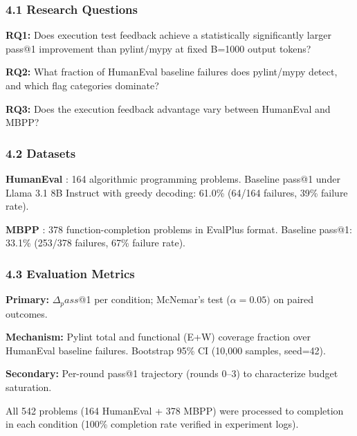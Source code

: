 
\subsubsection{4.1 Research Questions}

\textbf{RQ1:} Does execution test feedback achieve a statistically significantly larger pass@1 improvement than pylint/mypy at fixed B=1000 output tokens?

\textbf{RQ2:} What fraction of HumanEval baseline failures does pylint/mypy detect, and which flag categories dominate?

\textbf{RQ3:} Does the execution feedback advantage vary between HumanEval and MBPP?

\subsubsection{4.2 Datasets}

\textbf{HumanEval} \citep{Chen2021}: 164 algorithmic programming problems. Baseline pass@1 under Llama 3.1 8B Instruct with greedy decoding: 61.0\% (64/164 failures, 39\% failure rate).

\textbf{MBPP} \citep{Austin2021}: 378 function-completion problems in EvalPlus format. Baseline pass@1: 33.1\% (253/378 failures, 67\% failure rate).

\begin{table}[htbp]
\centering
{}
\end{table}

\subsubsection{4.3 Evaluation Metrics}

\textbf{Primary:} $\Delta _pass$@1 per condition; McNemar's test ($\alpha =0.05)$ on paired outcomes.

\textbf{Mechanism:} Pylint total and functional (E+W) coverage fraction over HumanEval baseline failures. Bootstrap 95\% CI (10,000 samples, seed=42).

\textbf{Secondary:} Per-round pass@1 trajectory (rounds 0--3) to characterize budget saturation.

All 542 problems (164 HumanEval + 378 MBPP) were processed to completion in each condition (100\% completion rate verified in experiment logs).

